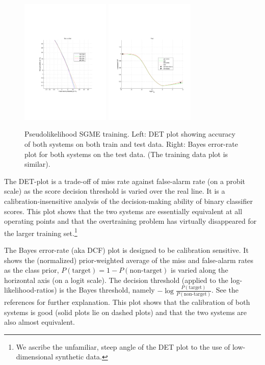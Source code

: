 \documentclass[a4paper,oneside,12pt,english]{report}
\begin{document}
\begin{figure}[htb!]
\centering
\includegraphics[height=6cm,trim={3cm 7cm 4cm 8cm},clip]{SGME_training_DET_plot.pdf}        %
\includegraphics[height=6cm,trim={0 7cm 2cm 8cm},clip]{SGME_training_DCF_plot.pdf}
\caption[Pseudolikelihood SGME training]{Pseudolikelihood SGME training. Left: DET plot showing accuracy of both systems on both train and test data. Right: Bayes error-rate plot for both systems on the test data. (The training data plot is similar).}
\label{fig:SGME_PsL_Train}
\end{figure}



The DET-plot is a trade-off of miss rate against false-alarm rate (on a probit scale) as the score decision threshold is varied over the real line. It is a calibration-insensitive analysis of the decision-making ability of binary classifier scores. This plot shows that the two systems are essentially equivalent at all operating points and that the overtraining problem has virtually disappeared for the larger training set.\footnote{We ascribe the unfamiliar, steep angle of the DET plot to the use of low-dimensional synthetic data.}

The Bayes error-rate (aka DCF) plot is designed to be calibration sensitive. It shows the (normalized) prior-weighted average of the miss and false-alarm rates as the class prior, $P(\text{target})=1-P(\text{non-target})$ is varied along the horizontal axis (on a logit scale). The decision threshold (applied to the log-likelihood-ratios) is the Bayes threshold, namely $-\log\frac{P(\text{target})}{P(\text{non-target})}$. See the references for further explanation. This plot shows that the calibration of both systems is good (solid plots lie on dashed plots) and that the two systems are also almost equivalent. 
\end{document}
